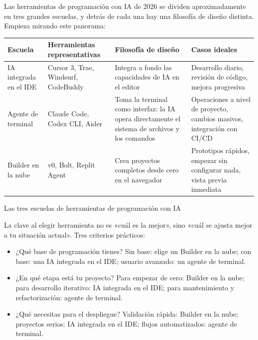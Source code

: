 


Las herramientas de programación con IA de 2026 se dividen aproximadamente en tres grandes escuelas, y detrás de cada una hay una filosofía de diseño distinta. Empieza mirando este panorama:

\begin{center}
\begin{tabularx}{\linewidth}{|X|X|X|X|}
\hline
\textbf{Escuela} & \textbf{Herramientas representativas} & \textbf{Filosofía de diseño} & \textbf{Casos ideales} \tabularnewline
\hline
IA integrada en el IDE & Cursor 3, Trae, Windsurf, CodeBuddy & Integra a fondo las capacidades de IA en el editor & Desarrollo diario, revisión de código, mejora progresiva \tabularnewline
Agente de terminal & Claude Code, Codex CLI, Aider & Toma la terminal como interfaz: la IA opera directamente el sistema de archivos y los comandos & Operaciones a nivel de proyecto, cambios masivos, integración con CI/CD \tabularnewline
Builder en la nube & v0, Bolt, Replit Agent & Crea proyectos completos desde cero en el navegador & Prototipos rápidos, empezar sin configurar nada, vista previa inmediata \tabularnewline
\hline
\end{tabularx}
\end{center}

\begin{center}\small\color{gray}Las tres escuelas de herramientas de programación con IA\end{center}

La clave al elegir herramienta no es «cuál es la mejor», sino «cuál se ajusta mejor a tu situación actual». Tres criterios prácticos:

\begin{itemize}
  \item ¿Qué base de programación tienes? Sin base: elige un Builder en la nube; con base: una IA integrada en el IDE; usuario avanzado: un agente de terminal.
  \item ¿En qué etapa está tu proyecto? Para empezar de cero: Builder en la nube; para desarrollo iterativo: IA integrada en el IDE; para mantenimiento y refactorización: agente de terminal.
  \item ¿Qué necesitas para el despliegue? Validación rápida: Builder en la nube; proyectos serios: IA integrada en el IDE; flujos automatizados: agente de terminal.
\end{itemize}

